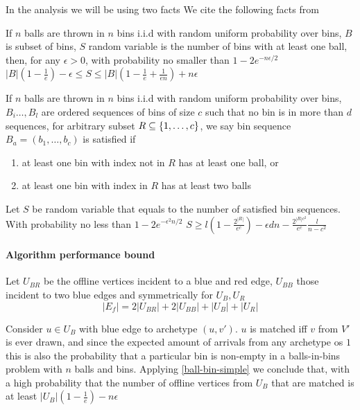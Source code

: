 In the analysis we will be using two facts
We cite the following facts from \cite{obmStochastic}
\begin{fact}
	\label{ball-bin-simple}
	If $n$ balls are thrown in $n$ bins i.i.d with random uniform probability over bins, $B$ is subset of bins, $S$ random variable is the number of bins with at least one ball, then, for any $\epsilon>0$, with probability no smaller than $1-2e^{-n \epsilon/2}$ $|B|(1-\frac{1}{e})-\epsilon\leq S\leq |B|(1-\frac{1}{e}+\frac{1}{en})+n\epsilon$
\end{fact}
\begin{fact}\label{ball-bin-complex}
	If $n$ balls are thrown in $n$ bins i.i.d with random uniform probability over bins, $B_i\dots,B_l$ are ordered sequences of bins of size $c$ such that no bin is in more than $d$ sequences, for arbitrary subset $R\subseteq\{1,\dots,c\}$, we say bin sequence $B_a=(b_1,\dots,b_c)$ is satisfied if
	\begin{enumerate}
		\item at least one bin with index not in $R$ has at least one ball, or
		\item at least one bin with index in $R$ has at least two balls
	\end{enumerate}
	Let $S$ be random variable that equals to the number of satisfied bin sequences. With probability no less than $1-2e^{-\epsilon^2n/2}$ $S\geq l(1-\frac{2^{|R|}}{e^c})-\epsilon dn-\frac{2^{|R|c^2}}{e^c}\frac{l}{n-c^2}$
\end{fact}

\paragraph{Algorithm performance bound}
Let $U_{BR}$ be the offline vertices incident to a blue and red edge, $U_{BB}$ those incident to two blue edges and symmetrically for $U_B,U_R$\\
\begin{equation}
	\label{st-eq1}
	|E_f|=2|U_{BR}|+2|U_{BB}|+|U_B|+|U_R|
\end{equation}


Consider $u\in U_B$ with blue edge to archetype $(u,v')$. $u$ is matched iff $v$ from $V'$ is ever drawn, and since the expected amount of arrivals from any archetype os $1$ this is also the probability that a particular bin is non-empty in a balls-in-bins problem with $n$ balls and bins. Applying \autoref{ball-bin-simple} we conclude that, with a high probability that the number of offline vertices from $U_B$ that are matched is at least $|U_B|(1-\frac{1}{e})-n \epsilon$\\

